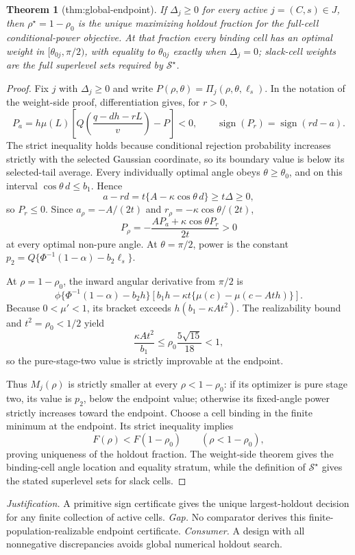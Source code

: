 \documentclass{article}
\newtheorem{theorem}{Theorem}
\begin{document}
\begin{theorem}[thm:global-endpoint]\label{thm:global-endpoint}
If \(\Delta_j\ge0\) for every active \(j=(C,s)\in J\), then \(\rho^{\star}=1-\rho_0\) is the unique maximizing holdout fraction for the full-cell conditional-power objective. At that fraction every binding cell has an optimal weight in \([\theta_{0j},\pi/2)\), with equality to \(\theta_{0j}\) exactly when \(\Delta_j=0\); slack-cell weights are the full superlevel sets required by \(\mathcal{S}^{\star}\).
\end{theorem}
\begin{proof}
Fix \(j\) with \(\Delta_j\ge0\) and write \(P(\rho,\theta)=\Pi_j(\rho,\theta,\ell_s)\).  In the notation of the weight-side proof, differentiation gives, for \(r>0\),
\[
P_a=h\mu(L)\left[Q\!\left(\frac{q-dh-rL}{v}\right)-P\right]<0,
\qquad
\operatorname{sign}(P_r)=\operatorname{sign}(rd-a).
\]
The strict inequality holds because conditional rejection probability increases strictly with the selected Gaussian coordinate, so its boundary value is below its selected-tail average.  Every individually optimal angle obeys \(\theta\ge\theta_0\), and on this interval \(\cos\theta\,d\le b_1\).  Hence
\[
a-rd=t\{A-\kappa\cos\theta\,d\}\ge t\Delta\ge0,
\]
so \(P_r\le0\).  Since \(a_\rho=-A/(2t)\) and \(r_\rho=-\kappa\cos\theta/(2t)\),
\[
P_\rho=-\frac{AP_a+\kappa\cos\theta P_r}{2t}>0
\]
at every optimal non-pure angle.  At \(\theta=\pi/2\), power is the constant \(p_2=Q\{\Phi^{-1}(1-\alpha)-b_2\ell_s\}\).

At \(\rho=1-\rho_0\), the inward angular derivative from \(\pi/2\) is
\[
\phi\{\Phi^{-1}(1-\alpha)-b_2h\}
\left[b_1h-\kappa t\{\mu(c)-\mu(c-Ath)\}\right].
\]
Because \(0<\mu'<1\), its bracket exceeds \(h(b_1-\kappa At^2)\).  The realizability bound and \(t^2=\rho_0<1/2\) yield
\[
\frac{\kappa At^2}{b_1}
\le\rho_0\frac{5\sqrt{15}}{18}<1,
\]
so the pure-stage-two value is strictly improvable at the endpoint.

Thus \(M_j(\rho)\) is strictly smaller at every \(\rho<1-\rho_0\): if its optimizer is pure stage two, its value is \(p_2\), below the endpoint value; otherwise its fixed-angle power strictly increases toward the endpoint.  Choose a cell binding in the finite minimum at the endpoint.  Its strict inequality implies
\[
F(\rho)<F(1-\rho_0)\qquad(\rho<1-\rho_0),
\]
proving uniqueness of the holdout fraction.  The weight-side theorem gives the binding-cell angle location and equality stratum, while the definition of \(\mathcal S^\star\) gives the stated superlevel sets for slack cells.
\end{proof}
\par\smallskip\noindent \textit{Justification.} A primitive sign certificate gives the unique largest-holdout decision for any finite collection of active cells. \textit{Gap.} No comparator derives this finite-population-realizable endpoint certificate. \textit{Consumer.} A design with all nonnegative discrepancies avoids global numerical holdout search.
\end{document}
